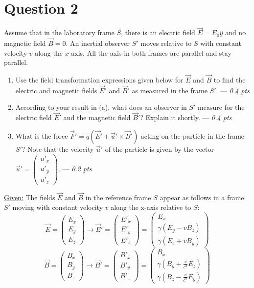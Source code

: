 \section*{Question 2}
Assume that in the laboratory frame $S$, there is an electric field $\vec{E} = E_0 \hat{y}$ and no magnetic field $\vec{B} = 0$. An inertial observer $S'$ moves relative to $S$ with constant velocity $v$ along the $x$-axis. All the axis in both frames are parallel and stay parallel.
\begin{enumerate}
    \item[(a)] Use the field transformation expressions given below for $\vec{E}$ and $\vec{B}$ to find the electric and magnetic fields $\vec{E}'$ and $\vec{B}'$ as measured in the frame $S'$. --- \textit{0.4 pts}
    \item[(b)] According to your result in (a), what does an observer in $S'$ measure for the electric field $\vec{E}'$ and the magnetic field $\vec{B}'$? Explain it shortly. --- \textit{0.4 pts}
    \item[(c)] What is the force $\vec{F}'=q\left(\vec{E}' + \vec{u}'\times \vec{B}'\right)$ acting on the particle in the frame $S'$? Note that the velocity $\vec{u}'$ of the particle is given by the vector $\vec{u}'=\begin{pmatrix}
    u'_x \\ u'_y \\ u'_z
\end{pmatrix}$. --- \textit{0.2 pts}
\end{enumerate}
\noindent
\underline{Given:}
The fields $\vec{E}$ and $\vec{B}$ in the reference frame $S$ appear as follows in a frame $S'$ moving with constant velocity $v$ along the x-axis relative to $S$:
\[
\vec{E} = \begin{pmatrix}
E_x \\ E_y \\ E_z
\end{pmatrix} \longrightarrow
\vec{E}' = \begin{pmatrix}
E'_x \\ E'_y \\ E'_z
\end{pmatrix} = \begin{pmatrix}
E_x \\ \gamma \left( E_y - v B_z \right)\\ \gamma \left( E_z + v B_y \right)
\end{pmatrix}
\]
\[
\vec{B} = \begin{pmatrix}
B_x \\ B_y \\ B_z
\end{pmatrix} \longrightarrow
\vec{B}' = \begin{pmatrix}
B'_x \\ B'_y \\ B'_z
\end{pmatrix} = \begin{pmatrix}
B_x \\ \gamma \left( B_y + \frac{v}{c^2} E_z \right) \\ \gamma \left( B_z - \frac{v}{c^2} E_y \right)
\end{pmatrix}
\]
